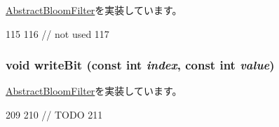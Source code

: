 \hyperlink{classAbstractBloomFilter_a0a35d1c7bad19fe9362068a0d319ec5f}{AbstractBloomFilter}を実装しています。


\begin{DoxyCode}
115 {
116     // not used
117 }
\end{DoxyCode}
\hypertarget{classBulkBloomFilter_ac188318778d26b44f567c5b530598c16}{
\subsubsection[{writeBit}]{\setlength{\rightskip}{0pt plus 5cm}void writeBit (const int {\em index}, \/  const int {\em value})}}
\label{classBulkBloomFilter_ac188318778d26b44f567c5b530598c16}


\hyperlink{classAbstractBloomFilter_a961813caf7bb3aece26914ac43c6293f}{AbstractBloomFilter}を実装しています。


\begin{DoxyCode}
209 {
210     // TODO
211 }
\end{DoxyCode}



